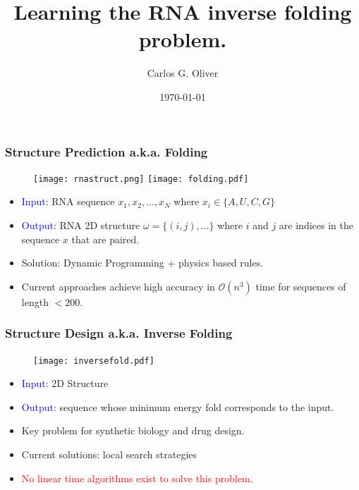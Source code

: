 \documentclass{beamer}
\title{Learning the RNA inverse folding problem.}
\author{Carlos G. Oliver}
\date{\today}
\begin{document}
\frame{\titlepage}


\frame
{
  \frametitle{Structure Prediction a.k.a. Folding}
  
  \begin{figure}
	\texttt{[image: rnastruct.png]}
  	\texttt{[image: folding.pdf]} 
  \end{figure}

  
  
 \begin{itemize}
	\item  \textcolor{blue}{Input:} RNA sequence $x_1, x_2, ..., x_N$ where $x_i \in \{A, U, C, G\}$ \\
	\item  \textcolor{blue}{Output:} RNA 2D structure $\omega = \{(i, j), ... \}$ where $i$ and $j$ are indices in the sequence $x$ that are paired.
	\item Solution: Dynamic Programming + physics based rules.
	\item Current approaches achieve high accuracy in $\mathcal{O}(n^{3})$ time for sequences of length $< 200$. 
\end{itemize} 
  
  }
  
  \frame
  {
  	\frametitle{Structure Design a.k.a. Inverse Folding}
	
	
	\begin{figure}
		\texttt{[image: inversefold.pdf]}
	\end{figure}
  
  	\begin{itemize}
		\item \textcolor{blue}{Input:} 2D Structure
		\item \textcolor{blue}{Output:} sequence whose minimum energy fold corresponds to the input.
		\item Key problem for synthetic biology and drug design.
		\item Current solutions: local search strategies
		\item \textcolor{red}{No linear time algorithms exist to solve this problem.}
	\end{itemize}
  
  }
  
\end{document}
